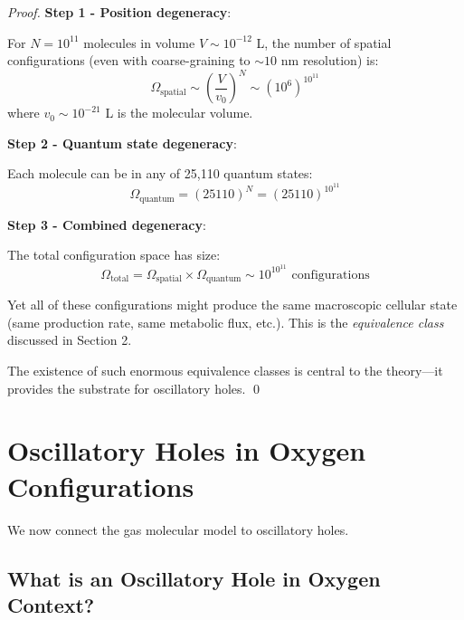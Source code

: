 \documentclass[12pt,a4paper]{article}
\begin{document}
\begin{proof}
\textbf{Step 1 - Position degeneracy}:

For $N = 10^{11}$ molecules in volume $V \sim 10^{-12}$ L, the number of spatial configurations (even with coarse-graining to $\sim 10$ nm resolution) is:
\begin{equation}
\Omega_{\text{spatial}} \sim \left(\frac{V}{v_0}\right)^N \sim (10^6)^{10^{11}}
\end{equation}
where $v_0 \sim 10^{-21}$ L is the molecular volume.

\textbf{Step 2 - Quantum state degeneracy}:

Each molecule can be in any of 25,110 quantum states:
\begin{equation}
\Omega_{\text{quantum}} = (25110)^{N} = (25110)^{10^{11}}
\end{equation}

\textbf{Step 3 - Combined degeneracy}:

The total configuration space has size:
\begin{equation}
\Omega_{\text{total}} = \Omega_{\text{spatial}} \times \Omega_{\text{quantum}} \sim 10^{10^{11}} \text{ configurations}
\end{equation}

Yet all of these configurations might produce the same macroscopic cellular state (same  production rate, same metabolic flux, etc.). This is the \textit{equivalence class} discussed in Section 2.

The existence of such enormous equivalence classes is central to the theory—it provides the substrate for oscillatory holes. \qed
\end{proof}

\section{Oscillatory Holes in Oxygen Configurations}

We now connect the gas molecular model to oscillatory holes.

\subsection{What is an Oscillatory Hole in Oxygen Context?}
\end{document}
